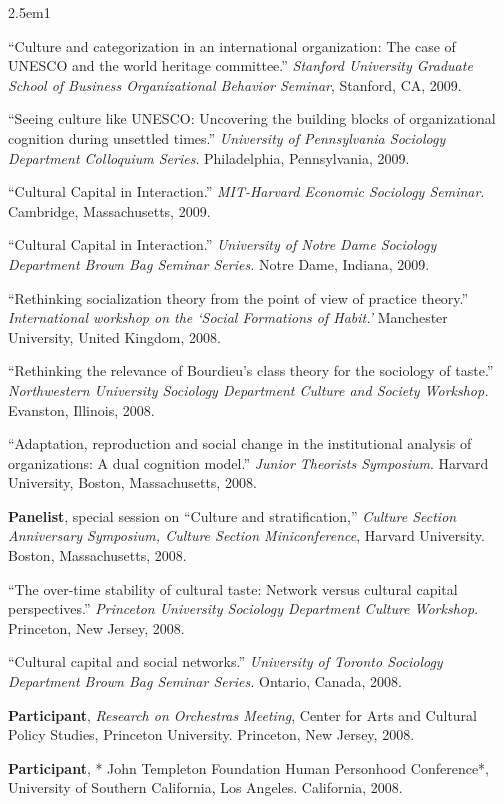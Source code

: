 \documentclass[
]{article}
\newenvironment{cventry}{\begin{hangparas}{2.5em}{1}}{\end{hangparas}}
\begin{document}
\begin{cventry}

``Culture and categorization in an international organization: The case
of UNESCO and the world heritage committee.'' \emph{Stanford University
Graduate School of Business Organizational Behavior Seminar}, Stanford,
CA, 2009.

``Seeing culture like UNESCO: Uncovering the building blocks of
organizational cognition during unsettled times.'' \emph{University of
Pennsylvania Sociology Department Colloquium Series}. Philadelphia,
Pennsylvania, 2009.

``Cultural Capital in Interaction.'' \emph{MIT-Harvard Economic
Sociology Seminar}. Cambridge, Massachusetts, 2009.

``Cultural Capital in Interaction.'' \emph{University of Notre Dame
Sociology Department Brown Bag Seminar Series.} Notre Dame, Indiana,
2009.

``Rethinking socialization theory from the point of view of practice
theory.'' \emph{International workshop on the `Social Formations of
Habit.'} Manchester University, United Kingdom, 2008.

``Rethinking the relevance of Bourdieu's class theory for the sociology
of taste.'' \emph{Northwestern University Sociology Department Culture
and Society Workshop.} Evanston, Illinois, 2008.

``Adaptation, reproduction and social change in the institutional
analysis of organizations: A dual cognition model.'' \emph{Junior
Theorists Symposium}. Harvard University, Boston, Massachusetts, 2008.

\textbf{Panelist}, special session on ``Culture and stratification,''
\emph{Culture Section Anniversary Symposium, Culture Section
Miniconference}, Harvard University. Boston, Massachusetts, 2008.

``The over-time stability of cultural taste: Network versus cultural
capital perspectives.'' \emph{Princeton University Sociology Department
Culture Workshop}. Princeton, New Jersey, 2008.

``Cultural capital and social networks.'' \emph{University of Toronto
Sociology Department Brown Bag Seminar Series.} Ontario, Canada, 2008.

\textbf{Participant}, \emph{Research on Orchestras Meeting}, Center for
Arts and Cultural Policy Studies, Princeton University. Princeton, New
Jersey, 2008.

\textbf{Participant}, * John Templeton Foundation Human Personhood
Conference*, University of Southern California, Los Angeles. California,
2008.


\end{cventry}
\end{document}
